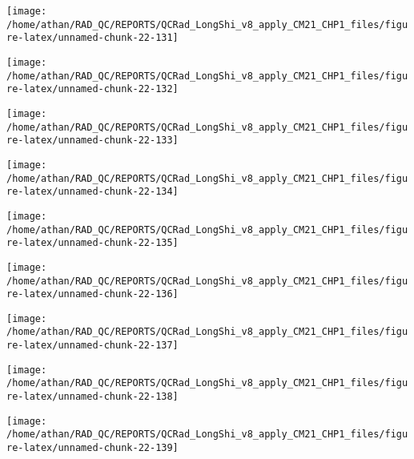 \documentclass[
  10pt,
  a4paper,oneside]{article}
\begin{document}
\begin{center}\texttt{[image: /home/athan/RAD\_QC/REPORTS/QCRad\_LongShi\_v8\_apply\_CM21\_CHP1\_files/figure-latex/unnamed-chunk-22-131]} \end{center}

\begin{center}\texttt{[image: /home/athan/RAD\_QC/REPORTS/QCRad\_LongShi\_v8\_apply\_CM21\_CHP1\_files/figure-latex/unnamed-chunk-22-132]} \end{center}

\begin{center}\texttt{[image: /home/athan/RAD\_QC/REPORTS/QCRad\_LongShi\_v8\_apply\_CM21\_CHP1\_files/figure-latex/unnamed-chunk-22-133]} \end{center}

\begin{center}\texttt{[image: /home/athan/RAD\_QC/REPORTS/QCRad\_LongShi\_v8\_apply\_CM21\_CHP1\_files/figure-latex/unnamed-chunk-22-134]} \end{center}

\begin{center}\texttt{[image: /home/athan/RAD\_QC/REPORTS/QCRad\_LongShi\_v8\_apply\_CM21\_CHP1\_files/figure-latex/unnamed-chunk-22-135]} \end{center}

\begin{center}\texttt{[image: /home/athan/RAD\_QC/REPORTS/QCRad\_LongShi\_v8\_apply\_CM21\_CHP1\_files/figure-latex/unnamed-chunk-22-136]} \end{center}

\begin{center}\texttt{[image: /home/athan/RAD\_QC/REPORTS/QCRad\_LongShi\_v8\_apply\_CM21\_CHP1\_files/figure-latex/unnamed-chunk-22-137]} \end{center}

\begin{center}\texttt{[image: /home/athan/RAD\_QC/REPORTS/QCRad\_LongShi\_v8\_apply\_CM21\_CHP1\_files/figure-latex/unnamed-chunk-22-138]} \end{center}

\begin{center}\texttt{[image: /home/athan/RAD\_QC/REPORTS/QCRad\_LongShi\_v8\_apply\_CM21\_CHP1\_files/figure-latex/unnamed-chunk-22-139]} \end{center}
\end{document}
